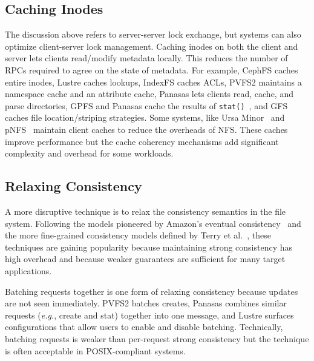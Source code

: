 \subsection{Caching Inodes}
\label{sec:caching-inodes}

The discussion above refers to server-server lock exchange, but systems can
also optimize client-server lock management. Caching inodes on both the client
and server lets clients read/modify metadata locally.  This reduces the number
of RPCs required to agree on the state of metadata.  For example, CephFS caches
entire inodes, Lustre caches lookups, IndexFS caches ACLs, PVFS2 maintains a
namespace cache and an attribute cache, Panasas lets clients read, cache, and
parse directories, GPFS and Panasas cache the results of
\texttt{stat()}~\cite{depardon:tech13-survey}, and GFS caches file
location/striping strategies.  Some systems, like Ursa
Minor~\cite{sinnamohideen:atc2010-ursa} and
pNFS~\cite{hildebrand:msst2005-pnfs} maintain client caches to reduce the
overheads of NFS. These caches improve performance but the cache coherency
mechanisms add significant complexity and overhead for some workloads.

\subsection{Relaxing Consistency}
\label{sec:relaxing-consistency}

A more disruptive technique is to relax the consistency semantics in the file
system.  Following the models pioneered by Amazon's eventual
consistency~\cite{decandia:sosp2007-dynamo} and the more fine-grained
consistency models defined by Terry et al.~\cite{terry_replicated_2013}, these
techniques are gaining popularity because maintaining strong consistency has
high overhead and because weaker guarantees are sufficient for many target
applications. 

Batching requests together is one form of relaxing consistency because updates
are not seen immediately. PVFS2 batches creates, Panasas combines similar
requests ({\it e.g.}, create and stat) together into one message, and Lustre
surfaces configurations that allow users to enable and disable batching.
Technically, batching requests is weaker than per-request strong consistency
but the technique is often acceptable in POSIX-compliant systems.

